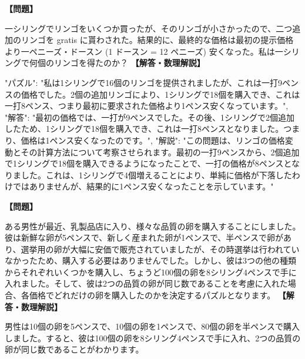 \documentclass[10pt,a4paper,oneside,openany]{ltjsbook}
\begin{document}
\begin{tcolorbox}[colback=softblue,colframe=primaryblue,title=\textbf{第 21 問：A DEAL IN APPLES.},arc=2mm,boxrule=1pt,breakable]
\textbf{【問題】}\par\vspace{0.3em}
一シリングでリンゴをいくつか買ったが、そのリンゴが小さかったので、二つ追加のリンゴを gratis に貰わされた。結果的に、最終的な価格は最初の提示価格より一ペニーズ・ドースン (1 ドースン = 12 ペニーズ) 安くなった。私は一シリングで何個のリンゴを得たのか？
\tcblower
\textbf{【解答・数理解説】}\par\vspace{0.3em}
{
"パズル": "私は1シリングで16個のリンゴを提供されましたが、これは一打9ペンスの価格でした。2個の追加リンゴにより、1シリングで18個を購入でき、これは一打8ペンス、つまり最初に要求された価格より1ペンス安くなっています。",
"解答": "最初の価格では、一打が9ペンスでした。その後、1シリングで2個追加したため、1シリングで18個を購入でき、これは一打8ペンスとなりました。つまり、価格は1ペンス安くなったのです。",
"解説": "この問題は、リンゴの価格変動とその計算方法について考察させられます。最初の一打9ペンスから、2個追加で1シリングで18個を購入できるようになったことで、一打の価格が8ペンスとなりました。これは、1シリングで4個増えることにより、単純に価格が下落したわけではありませんが、結果的に1ペンス安くなったことを示しています。"
}
\end{tcolorbox}

\begin{tcolorbox}[colback=softblue,colframe=primaryblue,title=\textbf{第 22 問：卵の取引 （原題: A DEAL IN EGGS.）},arc=2mm,boxrule=1pt,breakable]
\textbf{【問題】}\par\vspace{0.3em}
ある男性が最近、乳製品店に入り、様々な品質の卵を購入することにしました。彼は新鮮な卵が5ペンスで、新しく産まれた卵が1ペンスで、半ペンスで卵があり、選挙用の卵が大幅に安価で販売されていましたが、その時選挙は行われていなかったため、購入する必要はありませんでした。しかし、彼は3つの他の種類からそれぞれいくつかを購入し、ちょうど100個の卵を8シリング4ペンスで手に入れました。そして、彼は2つの品質の卵が同じ数であることを考慮に入れた場合、各価格でどれだけの卵を購入したのかを決定するパズルとなります。
\tcblower
\textbf{【解答・数理解説】}\par\vspace{0.3em}
男性は10個の卵を5ペンスで、10個の卵を1ペンスで、80個の卵を半ペンスで購入しました。すると、彼は100個の卵を8シリング4ペンスで手に入れ、2つの品質の卵が同じ数であることがわかります。
\end{tcolorbox}
\end{document}
